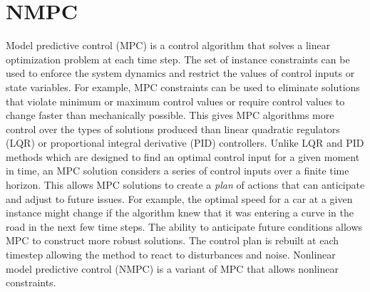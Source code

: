 \documentclass[]{article}
\newcommand{\mpc}{MPC}
\newcommand{\nmpc}{NMPC}
\begin{document}
	


\section*{NMPC}

Model predictive control (\mpc) is a control algorithm that solves a linear optimization problem at each time step. 
The set of instance constraints can be used to enforce the system dynamics and restrict the values of control inputs or state variables.  For example, {\mpc} constraints can be used to eliminate solutions that violate minimum or maximum control values or require control values to change faster than mechanically possible.  This gives {\mpc} algorithms more control over the types of solutions produced than linear quadratic regulators (LQR) or proportional integral derivative (PID) controllers.  
Unlike LQR and PID methods which are designed to find an optimal control input for a given moment in time, an {\mpc} solution considers a series of control inputs over a finite time horizon.  This allows {\mpc} solutions to create a {\em plan} of actions that can anticipate and adjust to future issues. For example, the optimal speed for a car at a given instance might change if the algorithm knew that it was entering a curve in the road in the next few time steps.
The ability to anticipate future conditions allows {\mpc} to construct more robust solutions. The control plan is rebuilt at each timestep allowing the method to react to disturbances and noise.
Nonlinear model predictive control (\nmpc) is a variant of {\mpc} that allows nonlinear constraints. 
\end{document}
